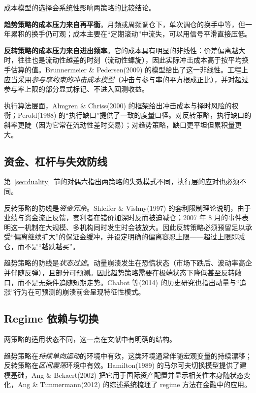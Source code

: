成本模型的选择会系统性影响两策略的比较结论。

\textbf{趋势策略的成本压力来自再平衡}。月频或周频调仓下，单次调仓的换手中等，但一年累积的换手仍可观；成本主要在“定期滚动”中流失，可以用信号平滑直接压低。

\textbf{反转策略的成本压力来自进出频率}。它的成本具有明显的非线性：价差偏离越大时，往往也是流动性越差的时刻（流动性螺旋），因此实际冲击成本高于按平均换手估算的值。Brunnermeier \& Pedersen(2009) 的模型给出了这一非线性\cite{brunnermeier2009}。工程上应当采用\emph{参与率约束的冲击成本模型}（冲击与参与率的平方根成正比），并对超过参与率上限的部分显式标记、不进入回测收益。

执行算法层面，Almgren \& Chriss(2000) 的框架给出冲击成本与择时风险的权衡\cite{almgrenchriss2000}；Perold(1988) 的“执行缺口”提供了一致的度量口径\cite{perold1988}。对反转策略，执行缺口的斜率更陡（因为它常在流动性差时交易）；对趋势策略，缺口更平坦但累积量更大。

\subsection{资金、杠杆与失效防线}

第~\ref{sec:duality}~节的对偶六指出两策略的失效模式不同，执行层的应对也必须不同。

反转策略的防线是\emph{资金冗余}。Shleifer \& Vishny(1997) 的套利限制理论说明，由于业绩与资金流正反馈，套利者在错价加深时反而被迫减仓\cite{shleifervishny1997}；2007 年 8 月的事件表明这一机制在大规模、多机构同时发生时会被放大\cite{khandanilo2011}。因此反转策略必须预留足以承受“偏离继续扩大”的保证金缓冲，并设定明确的偏离容忍上限——超过上限即减仓，而不是“越跌越买”。

趋势策略的防线是\emph{状态过滤}。动量崩溃发生在恐慌状态（市场下跌后、波动率高企并伴随反弹），且部分可预测\cite{danielmoskowitz2016}。因此趋势策略需要在极端状态下降低甚至反转敞口，而不是无条件追随短期走势。Chabot 等(2014) 的历史研究也指出动量与“追涨”行为在可预测的崩溃前会呈现特征性模式\cite{chabot2014}。

\subsection{Regime 依赖与切换}

两策略的适用状态不同，这一点在文献中有明确的结构。

趋势策略在\emph{持续单向运动}的环境中有效，这类环境通常伴随宏观变量的持续漂移；反转策略在\emph{区间震荡}环境中有效。Hamilton(1989) 的马尔可夫切换模型提供了建模基础\cite{hamilton1989}，Ang \& Bekaert(2002) 把它用于国际资产配置并显示相关性本身随状态变化\cite{angbekaert2002}，Ang \& Timmermann(2012) 的综述系统梳理了 regime 方法在金融中的应用\cite{angtimmermann2012}。

